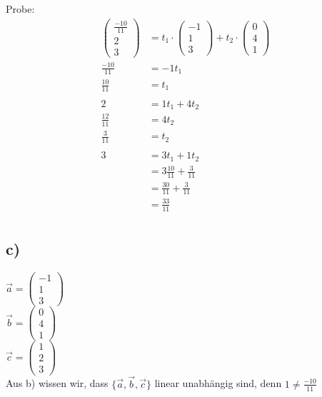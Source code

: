 \documentclass[]{article}
\begin{document}
Probe:
\begin{align*}
	&& \begin{pmatrix}\frac{-10}{11}\\2\\3\end{pmatrix} &= t_1\cdot \begin{pmatrix}-1\\1\\3
	\end{pmatrix} + t_2 \cdot \begin{pmatrix}0\\4\\1\end{pmatrix}  &&\\
	&& \frac{-10}{11}&= -1t_1 &&\\
	&& \frac{10}{11}&= t_1 &&\\
	\\
	&& 2&= 1t_1 + 4t_2 &&\\
	&& \frac{12}{11}&= 4t_2 &&\\
	&& \frac{3}{11}&= t_2 &&\\
	\\
	&& 3&= 3t_1 + 1t_2 &&\\
	&& &= 3\frac{10}{11} + \frac{3}{11} &&\\
	&& &= \frac{30}{11} + \frac{3}{11} &&\\
	&& &= \frac{33}{11} &&\\
\end{align*}
\newpage
\subsection*{c)}
$\vec{a}  = \begin{pmatrix}
	-1\\1\\3
\end{pmatrix}$\\
$\vec{b}  = \begin{pmatrix}
	0\\4\\1
\end{pmatrix}$\\
$\vec{c}  = \begin{pmatrix}
	1\\2\\3
\end{pmatrix}$\\
Aus b) wissen wir, dass $\{\vec{a},\vec{b},\vec{c}\}$ linear unabhängig sind, denn $1 \neq \frac{-10}{11}$
\end{document}
